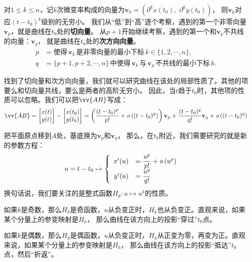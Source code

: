 \documentclass[12pt,UTF8,fontset=none]{ctexbook}
\begin{document}
对$1\leqslant k\leqslant n$，记$k$次微变率构成的向量为$\mathbf{v}_k = (\partial^k x(t_0) ,\,\, \partial^k y(t_0))$，
则$\mathbf{v}_k$对应$(t - t_0)^k$级别的无穷小。
我们从“低”到“高”逐个考察，遇到的第一个非零向量$\mathbf{v}_p$，就是曲线在$t_0$处的\textbf{切向量}。
从$p+1$开始继续考察，遇到的第一个和$\mathbf{v}_p$不共线的向量：$\mathbf{v}_q$，
就是曲线在$t_0$处的\textbf{次方向向量}。
\begin{align*}
    p &= \mbox{使得}\,\mathbf{v}_k\,\mbox{是非零向量的最小下标}\,k\in\{1,2,\cdots, n\}, \\
    q &= \{p+1,p+2,\cdots, n\}\,\mbox{中使得}\,\mathbf{v}_k\,\mbox{与}\,\mathbf{v}_p\,\mbox{不共线的最小下标}\, k. 
\end{align*}

找到了切向量和次方向向量，我们就可以研究曲线在该处的局部性质了。其他的项要么和切向量共线，要么是两者的高阶无穷小。
因此，当$t$趋于$t_0$时，其他项的性质可以忽略。我们可以把$\vv{AB}$写成：
$$
\vv{AB} = \begin{bmatrix} x(t) \\ y(t) \end{bmatrix} - \begin{bmatrix} x(t_0) \\ y(t_0) \end{bmatrix}
=
\left(\frac{(t - t_0)^p}{p!} + \olim{(t - t_0)^p}\right)\mathbf{v}_p
+
\frac{(t - t_0)^q}{q!}\mathbf{v}_q
+
\olim{(t - t_0)^q}
$$

把平面原点移到$A$处，基底换为$\mathbf{v}_p$和$\mathbf{v}_q$，
那么，在$t_0$附近，我们需要研究的就是新的参数方程：
\begin{align*}
    u = t - t_0 &\mapsto\left\{
        \begin{array}[]{rl}
            x'(u) &\displaystyle = \frac{u^p}{p!} + \olim{u^p} \\
            y'(u) &\displaystyle = \frac{u^q}{q!} \\
        \end{array}
    \right.
\end{align*}
换句话说，我们要关注的是整式函数$H_k: u\mapsto u^k$的性质。

如果$k$是奇数，那么$H_k$是奇函数，$u$从负变正时，$H_k$也从负变正。直观来说，如果某个分量上的参变映射是$H_k$，
那么曲线在该方向上的投影“穿过”$t_0$点。

如果$k$是偶数，那么$H_k$是偶函数，$u$从负变正时，$H_k$从正变为零，再变为正。直观来说，如果某个分量上的参变映射是$H_k$，
那么曲线在该方向上的投影“抵达”$t_0$点，然后“折返”。
\end{document}

